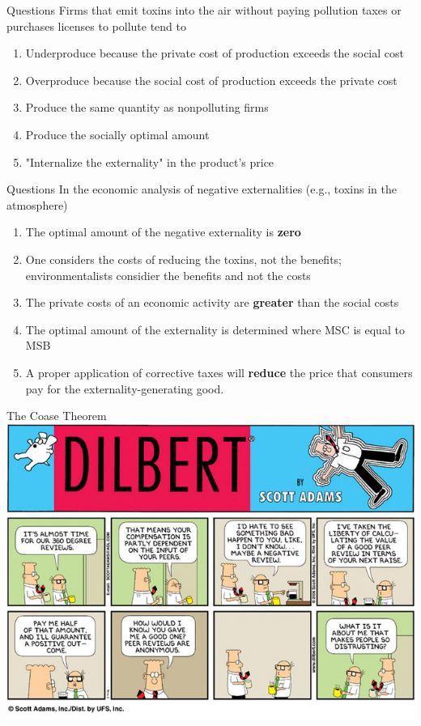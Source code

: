 \documentclass{beamer}
\begin{document}
\begin{frame}{Questions}
Firms that emit toxins into the air without paying pollution taxes or purchases licenses to pollute tend to 
\begin{enumerate}[label=\alph*)]
\item Underproduce because the private cost of production exceeds the social cost
\item Overproduce because the social cost of production exceeds the private cost
\item Produce the same quantity as nonpolluting firms
\item Produce the socially optimal amount
\item "Internalize the externality" in the product's price
\end{enumerate}
\end{frame}

\begin{frame}{Questions}
In the economic analysis of negative externalities (e.g., toxins in the atmosphere)
\begin{enumerate}[label=\alph*)]
\item The optimal amount of the negative externality is \textbf{zero}
\item One considers the costs of reducing the toxins, not the benefits; environmentalists considier the benefits and not the costs
\item The private costs of an economic activity are \textbf{greater} than the social costs
\item The optimal amount of the externality is determined where MSC is equal to MSB
\item A proper application of corrective taxes will \textbf{reduce} the price that consumers pay for the externality-generating good.
\end{enumerate}
\end{frame}

\begin{frame}{The Coase Theorem}
\includegraphics[width = \textwidth]{images/coasedilbert.jpg}
\end{frame}
\end{document}
